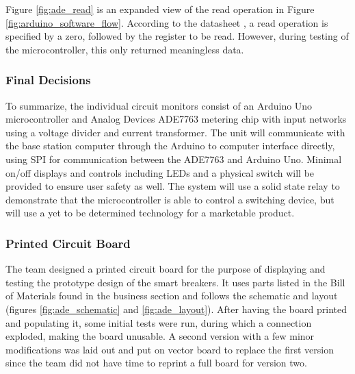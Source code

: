 Figure \ref{fig:ade_read} is an expanded view of the read operation in Figure \ref{fig:arduino_software_flow}. According to the datasheet \cite{ADE7763}, a read operation is specified by a zero, followed by the register to be read. However, during testing of the microcontroller, this only returned meaningless data.

\subsubsection{Final Decisions}
To summarize, the individual circuit monitors consist of an Arduino Uno microcontroller and Analog Devices ADE7763 metering chip with input networks using a voltage divider and current transformer. The unit will communicate with the base station computer through the Arduino to computer interface directly, using SPI for communication between the ADE7763 and Arduino Uno. Minimal on/off displays and controls including LEDs and a physical switch will be provided to ensure user safety as well. The system will use a solid state relay to demonstrate that the microcontroller is able to control a switching device, but will use a yet to be determined technology for a marketable product.

\subsubsection{Printed Circuit Board}
The team designed a printed circuit board for the purpose of displaying and testing the prototype design of the smart breakers. It uses parts listed in the Bill of Materials found in the business section and follows the schematic and layout (figures \ref{fig:ade_schematic} and \ref{fig:ade_layout}). After having the board printed and populating it, some initial tests were run, during which a connection exploded, making the board unusable. A second version with a few minor modifications was laid out and put on vector board to replace the first version since the team did not have time to reprint a full board for version two. 




